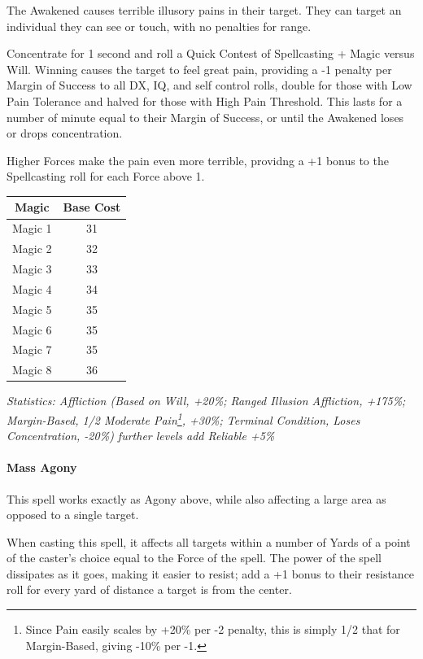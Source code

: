\begin{multicols*}{3}
	The Awakened causes terrible illusory pains in their target. They can target an individual they can see or touch, with no penalties for range.
	
	Concentrate for 1 second and roll a Quick Contest of Spellcasting + Magic versus Will. Winning causes the target to feel great pain, providing a -1 penalty per Margin of Success to all DX, IQ, and self control rolls, double for those with Low Pain Tolerance and halved for those with High Pain Threshold. This lasts for a number of minute equal to their Margin of Success, or until the Awakened loses or drops concentration.
	
	Higher Forces make the pain even more terrible, providng a +1 bonus to the Spellcasting roll for each Force above 1.
	
	\begin{center}
		\begin{tabular}{|c|c|}
			\hline
			Magic & Base Cost \\
			\hline
			\hline
			Magic 1 & 31 \\
			Magic 2 & 32 \\
			Magic 3 & 33 \\
			Magic 4 & 34 \\
			Magic 5 & 35 \\
			Magic 6 & 35 \\
			Magic 7 & 35 \\
			Magic 8 & 36 \\
			\hline
		\end{tabular}
	\end{center}

	\textcolor{OliveGreen}{\textit{Statistics: Affliction (Based on Will, +20\%; Ranged Illusion Affliction, +175\%; Margin-Based, 1/2 Moderate Pain\footnote{Since Pain easily scales by +20\% per -2 penalty, this is simply 1/2 that for Margin-Based, giving -10\% per -1.}, +30\%; Terminal Condition, Loses Concentration, -20\%)  further levels add Reliable +5\%}}
	
	\paragraph{Mass Agony}
	
	This spell works exactly as Agony above, while also affecting a large area as opposed to a single target.
	
	When casting this spell, it affects all targets within a number of Yards of a point of the caster's choice equal to the Force of the spell. The power of the spell dissipates as it goes, making it easier to resist; add a +1 bonus to their resistance roll for every yard of distance a target is from the center.
	

\end{multicols*}
